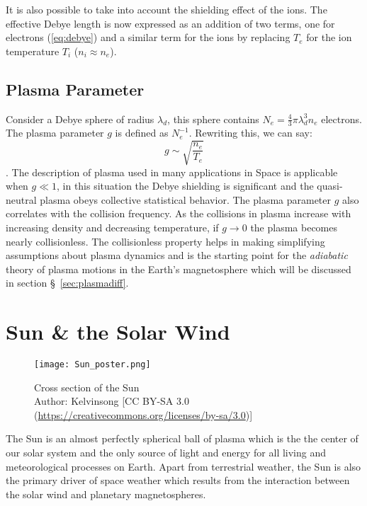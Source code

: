 It is also possible to take into account the shielding effect of the ions. The effective Debye 
length is now expressed as an addition of two terms, one for electrons (\cref{eq:debye}) and a 
similar term for the ions by replacing $T_e$ for the ion temperature $T_i$ ($n_i \approx n_e$). 

\subsection*{Plasma Parameter}

Consider a Debye sphere of radius $\lambda_d$, this sphere contains 
$N_e = \frac{4}{3}\pi \lambda^3_d n_e$ electrons. The plasma parameter $g$ is defined as 
$N_{e}^{-1}$. Rewriting this, we can say:
%
\[
    g \sim \sqrt{\frac{n_e}{T_e}}  
\].
%
The description of plasma used in many applications in Space is applicable when $g \ll 1$, in 
this situation the Debye shielding is significant and the quasi-neutral plasma obeys collective 
statistical behavior. The plasma parameter $g$ also correlates with the collision frequency. As the 
collisions in plasma increase with increasing density and decreasing temperature, if 
$g \longrightarrow 0$ the plasma becomes nearly collisionless. The collisionless property helps in 
making simplifying assumptions about plasma dynamics and is the starting point for the 
\emph{adiabatic} theory of plasma motions in the Earth's magnetosphere which will be discussed in 
section \S~\ref{sec:plasmadiff}.

\section{Sun \& the Solar Wind}\label{sec:solar}

\begin{figure}
    \noindent\centering\texttt{[image: Sun\_poster.png]}
    \caption{{\small Cross section of the Sun \\ 
    Author: Kelvinsong [CC BY-SA 3.0 (\url{https://creativecommons.org/licenses/by-sa/3.0})]}}
    \label{fig:SunLayers}
\end{figure}

The Sun is an almost perfectly spherical ball of plasma which is the the center of our solar 
system and the only source of light and energy for all living and meteorological processes on 
Earth. Apart from terrestrial weather, the Sun is also the primary driver of space weather which 
results from the interaction between the solar wind and planetary magnetospheres.

